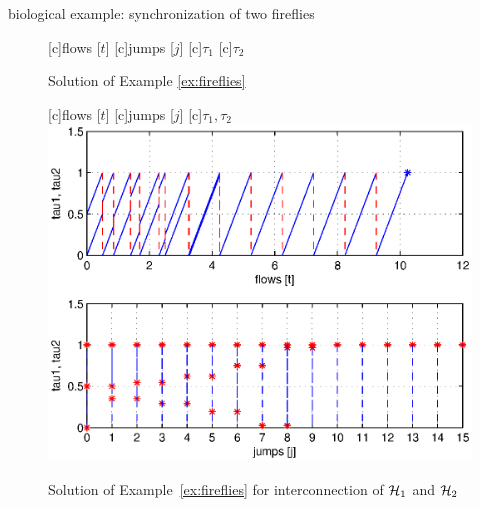 \begin{example}{biological example: synchronization of two fireflies}

\begin{figure}[ht]
  [c]{flows [$t$]}
  [c]{jumps [$j$]}
  [c]{$\tau_1$}
  [c]{$\tau_2$}
  \centering
{}
\qquad
{}
  \caption{Solution of Example \ref{ex:fireflies}}
\end{figure}

\begin{figure}[ht]
  \begin{center}
  [c]{flows [$t$]}
  [c]{jumps [$j$]}
  [c]{$\tau_1, \tau_2$}
    {\includegraphics[width=.8\textwidth]{figures/Examples/fireflyH1H2.eps}}
   \caption{Solution of Example~\ref{ex:fireflies} for interconnection of $\mathcal{H}_1$ and $\mathcal{H}_2$}
\label{fig:fireflyH1H2}
  \end{center}
\end{figure}


\end{example}
